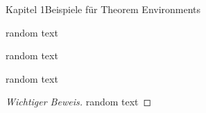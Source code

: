 \begin{frame}{Kapitel 1}{Beispiele für Theorem Environments}
  \begin{theorem}
    random text
  \end{theorem}

  \begin{corollary}
    random text
  \end{corollary}

  \begin{lemma}
    random text
  \end{lemma}

  \begin{proof}[Wichtiger Beweis]
    random text
  \end{proof}
\end{frame}
